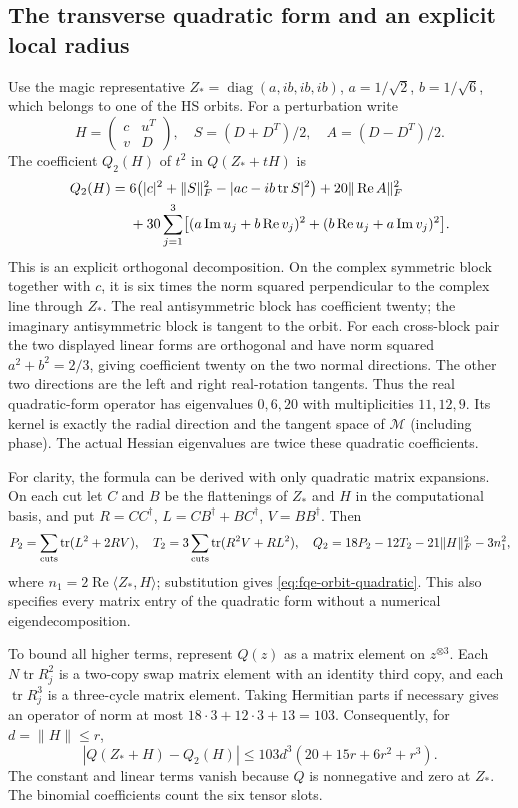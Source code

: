 \subsection{The transverse quadratic form and an explicit local radius}
\label{sec:fqe-orbit-local}
Use the magic representative $Z_* =\operatorname{diag}(a,ib,ib,ib)$,
$a=1/\sqrt2$, $b=1/\sqrt6$, which belongs to one of the HS orbits.
For a perturbation write
\[
 H=\begin{pmatrix}c&u^T\\v&D\end{pmatrix},\quad
 S=(D+D^T)/2,\quad A=(D-D^T)/2.
\]
The coefficient $Q_2(H)$ of $t^2$ in $Q(Z_*+tH)$ is
\begin{align}
 Q_2(H)={}&6\bigl(|c|^2+\|S\|_F^2-|ac-ib\operatorname{tr}S|^2\bigr)
       +20\|\operatorname{Re}A\|_F^2\notag\\
 &+30\sum_{j=1}^3\bigl[(a\operatorname{Im}u_j+b\operatorname{Re}v_j)^2
            +(b\operatorname{Re}u_j+a\operatorname{Im}v_j)^2\bigr].
 \label{eq:fqe-orbit-quadratic}
\end{align}
This is an explicit orthogonal decomposition. On the complex symmetric
block together with $c$, it is six times the norm squared perpendicular
to the complex line through $Z_*$. The real antisymmetric block has
coefficient twenty; the imaginary antisymmetric block is tangent to the
orbit. For each cross-block pair the two displayed linear forms are
orthogonal and have norm squared $a^2+b^2=2/3$, giving coefficient twenty
on the two normal directions. The other two directions are the left and
right real-rotation tangents. Thus the real quadratic-form operator has
eigenvalues $0,6,20$ with multiplicities $11,12,9$. Its kernel is exactly
the radial direction and the tangent space of $\mathcal M$ (including phase).
The actual Hessian eigenvalues are twice these quadratic coefficients.

For clarity, the formula can be derived with only quadratic matrix
expansions. On each cut let $C$ and $B$ be the flattenings of $Z_*$ and
$H$ in the computational basis, and put
$R=CC^\dagger$, $L=CB^\dagger+BC^\dagger$, $V=BB^\dagger$.
Then
\[
 P_2=\sum_{\rm cuts}\operatorname{tr}(L^2+2RV),\quad
 T_2=3\sum_{\rm cuts}\operatorname{tr}(R^2V+RL^2),\quad
 Q_2=18P_2-12T_2-21\|H\|_F^2-3n_1^2,
\]
where $n_1=2\operatorname{Re}\langle Z_*,H\rangle$; substitution gives
\eqref{eq:fqe-orbit-quadratic}. This also specifies every matrix entry
of the quadratic form without a numerical eigendecomposition.

To bound all higher terms, represent $Q(z)$ as a matrix element on
$z^{\otimes3}$. Each $N\operatorname{tr}R_j^2$ is a two-copy swap
matrix element with an identity third copy, and each
$\operatorname{tr}R_j^3$ is a three-cycle matrix element. Taking Hermitian
parts if necessary gives an operator of norm at most
$18\cdot3+12\cdot3+13=103$. Consequently, for $d=\|H\|\le r$,
\begin{equation}\label{eq:fqe-orbit-taylor}
 |Q(Z_*+H)-Q_2(H)|
 \le103d^3(20+15r+6r^2+r^3).
\end{equation}
The constant and linear terms vanish because $Q$ is nonnegative and
zero at $Z_*$. The binomial coefficients count the six tensor slots.

